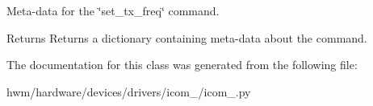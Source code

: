 Meta-\/data for the \char`\"{}set\-\_\-tx\-\_\-freq\char`\"{} command. 

\begin{DoxyReturn}{Returns}
Returns a dictionary containing meta-\/data about the command. 
\end{DoxyReturn}


The documentation for this class was generated from the following file\-:\begin{DoxyCompactItemize}
\item 
hwm/hardware/devices/drivers/icom\-\_/icom\-\_.\-py\end{DoxyCompactItemize}
